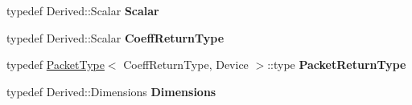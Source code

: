 \begin{DoxyCompactItemize}
\mbox{\label{struct_eigen_1_1_tensor_evaluator_a163cadb184cc08462355caf1031115a4}} 
typedef Derived\+::\+Scalar {\bfseries Scalar}
\item 
\mbox{\label{struct_eigen_1_1_tensor_evaluator_a664eb29b0c38061939b400fbc551c580}} 
typedef Derived\+::\+Scalar {\bfseries Coeff\+Return\+Type}
\item 
\mbox{\label{struct_eigen_1_1_tensor_evaluator_abe9fdcfec79a555a6762f8443c6a6a2c}} 
typedef \hyperlink{struct_eigen_1_1_packet_type}{Packet\+Type}$<$ Coeff\+Return\+Type, Device $>$\+::type {\bfseries Packet\+Return\+Type}
\item 
\mbox{\label{struct_eigen_1_1_tensor_evaluator_ac4139a59583bb1e6385d3a0195548b6b}} 
typedef Derived\+::\+Dimensions {\bfseries Dimensions}
\end{DoxyCompactItemize}
